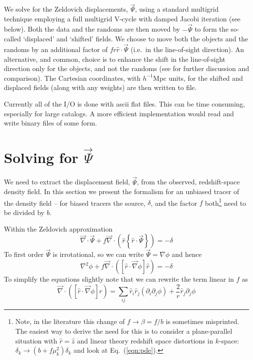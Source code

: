 \documentclass[a4paper,11pt]{article}
\begin{document}
We solve for the Zeldovich \cite{Zel70} displacements, $\vec{\Psi}$, using
a standard multigrid technique employing a full multigrid V-cycle with
damped Jacobi iteration (see below).
Both the data and the randoms are then moved by $-\vec{\Psi}$ to form the
so-called `displaced' and `shifted' fields.
We choose to move both the objects and the randoms by an additional factor
of $f\hat{r}\hat{r}\cdot\vec{\Psi}$ (i.e.~in the line-of-sight direction).
An alternative, and common, choice is to enhance the shift in the line-of-sight
direction only for the objects, and not the randoms
(see \cite{ZelRecon} for further discussion and comparison).
The Cartesian coordinates, with $h^{-1}$Mpc units, for the shifted and
displaced fields (along with any weights) are then written to file.

Currently all of the I/O is done with ascii flat files.  This can be time
consuming, especially for large catalogs.  A more efficient implementation
would read and write binary files of some form.

\section{Solving for $\vec{\Psi}$}
\label{sec:equations}

We need to extract the displacement field, $\vec{\Psi}$, from the observed,
redshift-space density field.  In this section we present the formalism for
an unbiased tracer of the density field -- for biased tracers the source,
$\delta$, and the factor $f$ both\footnote{Note, in the literature this change
of $f\to\beta=f/b$ is sometimes misprinted.  The easiest way to derive the need
for this is to consider a plane-parallel situation with $\hat{r}=\hat{z}$ and
linear theory redshift space distortions in $k$-space:
$\delta_k\to (b+f\mu_k^2)\delta_k$ and look at Eq.~(\ref{eqn:pde}).}
need to be divided by $b$.

Within the Zeldovich approximation \cite{Zel70}
\begin{equation}
  \vec{\nabla}\cdot\vec{\Psi} + f\vec{\nabla}\cdot
  \left(\hat{r}\left\{\hat{r}\cdot\vec{\Psi}\right\}\right)
  = -\delta
\end{equation}
To first order $\vec{\Psi}$ is irrotational, so we can write
$\vec{\Psi}=\nabla\phi$ and hence
\begin{equation}
  \nabla^2\phi +
  f\vec{\nabla}\cdot\left( \left[\hat{r}\cdot\vec{\nabla}\phi\right]
  \hat{r}\right) = -\delta
\label{eqn:pde}
\end{equation}
To simplify the equations slightly note that we can rewrite the term
linear in $f$ as
\begin{equation}
 \vec{\nabla}\cdot\left( \left[\hat{r}\cdot\vec{\nabla}\phi\right]\hat{r}\right)
 = \sum_{ij}\hat{r}_i\hat{r}_j\left(\partial_i\partial_j\phi\right)
  +  \frac{2}{r}\hat{r}_j\partial_j\phi
\label{eqn:fterm}
\end{equation}
\end{document}
